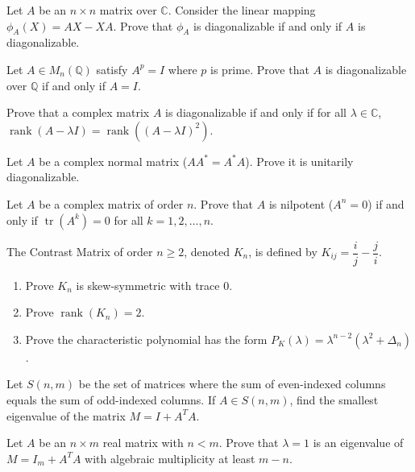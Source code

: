 \documentclass[12pt]{article}
\begin{document}
\begin{problem}
Let $A$ be an $n\times n$ matrix over $\mathbb{C}$. Consider the linear mapping $\phi_A(X)=AX-XA$. Prove that $\phi_A$ is diagonalizable if and only if $A$ is diagonalizable.
\end{problem}

\begin{problem}
Let $A\in M_n(\mathbb{Q})$ satisfy $A^p=I$ where $p$ is prime. Prove that $A$ is diagonalizable over $\mathbb{Q}$ if and only if $A=I$.
\end{problem}

\begin{problem}
Prove that a complex matrix $A$ is diagonalizable if and only if for all $\lambda\in\mathbb{C}$, $\operatorname{rank}(A-\lambda I) = \operatorname{rank}((A-\lambda I)^2)$.
\end{problem}

\begin{problem}
Let $A$ be a complex normal matrix ($AA^*=A^*A$). Prove it is unitarily diagonalizable.
\end{problem}

\begin{problem}
Let $A$ be a complex matrix of order $n$. Prove that $A$ is nilpotent ($A^n=0$) if and only if $\operatorname{tr}(A^k)=0$ for all $k=1,2,\dots,n$.
\end{problem}

\begin{problem}
The Contrast Matrix of order $n\ge 2$, denoted $K_n$, is defined by $K_{ij}=\dfrac{i}{j}-\dfrac{j}{i}$.
\begin{enumerate}[label=(\alph*)]
\item Prove $K_n$ is skew-symmetric with trace $0$.
\item Prove $\operatorname{rank}(K_n)=2$.
\item Prove the characteristic polynomial has the form $P_K(\lambda)=\lambda^{n-2}(\lambda^2+\Delta_n)$.
\end{enumerate}
\end{problem}

\begin{problem}
Let $S(n,m)$ be the set of matrices where the sum of even-indexed columns equals the sum of odd-indexed columns. If $A\in S(n,m)$, find the smallest eigenvalue of the matrix $M=I+A^TA$.
\end{problem}

\begin{problem}
Let $A$ be an $n\times m$ real matrix with $n<m$. Prove that $\lambda=1$ is an eigenvalue of $M=I_m+A^TA$ with algebraic multiplicity at least $m-n$.
\end{problem}
\end{document}
